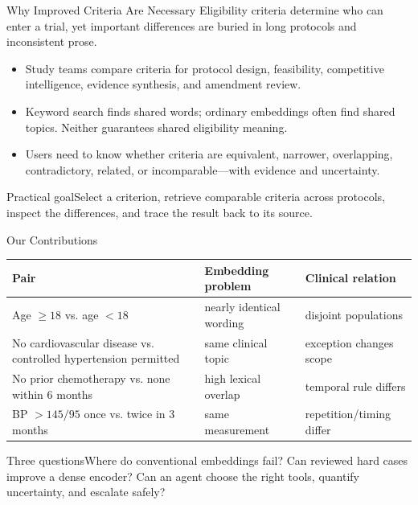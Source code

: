 \documentclass[aspectratio=169,10pt]{beamer}
\begin{document}
\begin{frame}{Why Improved Criteria Are Necessary}
Eligibility criteria determine who can enter a trial, yet important differences are buried in long protocols and inconsistent prose.
\begin{itemize}
\item Study teams compare criteria for protocol design, feasibility, competitive intelligence, evidence synthesis, and amendment review.
\item Keyword search finds shared words; ordinary embeddings often find shared topics. Neither guarantees shared eligibility meaning.
\item Users need to know whether criteria are equivalent, narrower, overlapping, contradictory, related, or incomparable---with evidence and uncertainty.
\end{itemize}
\begin{block}{Practical goal}Select a criterion, retrieve comparable criteria across protocols, inspect the differences, and trace the result back to its source.\end{block}
\end{frame}

\begin{frame}{Our Contributions}
\begin{tabularx}{\textwidth}{@{}X X X@{}}\toprule Pair & Embedding problem & Clinical relation \\\midrule
Age $\geq18$ vs. age $<18$ & nearly identical wording & disjoint populations \\
No cardiovascular disease vs. controlled hypertension permitted & same clinical topic & exception changes scope \\
No prior chemotherapy vs. none within 6 months & high lexical overlap & temporal rule differs \\
BP $>145/95$ once vs. twice in 3 months & same measurement & repetition/timing differ \\\bottomrule\end{tabularx}
\begin{block}{Three questions}Where do conventional embeddings fail? Can reviewed hard cases improve a dense encoder? Can an agent choose the right tools, quantify uncertainty, and escalate safely?\end{block}
\end{frame}
\end{document}
